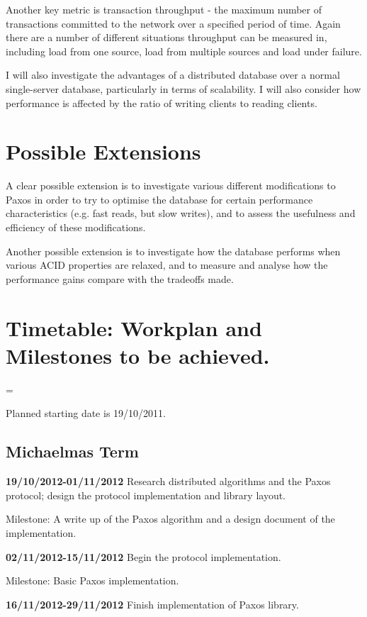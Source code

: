 Another key metric is transaction throughput - the maximum number of transactions committed to the
network over a specified period of time. Again there are a number of different situations
throughput can be measured in, including load from one source, load from multiple sources and
load under failure.

I will also investigate the advantages of a distributed database over a normal single-server
database, particularly in terms of scalability. I will also consider how performance is affected
by the ratio of writing clients to reading clients.

\section*{Possible Extensions}

A clear possible extension is to investigate various different modifications to Paxos in order
to try to optimise the database for certain performance characteristics
(e.g. fast reads, but slow writes),
and to assess the usefulness and efficiency of these modifications.

Another possible extension is to investigate how the database performs when various ACID
properties are relaxed, and to measure and analyse how the performance gains compare with the
tradeoffs made.


\section*{Timetable: Workplan and Milestones to be achieved.}

\setlength\parindent{0pt}
\parskip = \baselineskip

Planned starting date is 19/10/2011.

\subsection*{Michaelmas Term}

{\bf 19/10/2012-01/11/2012} Research distributed algorithms and the Paxos protocol; design the
protocol implementation and library layout.

Milestone: A write up of the Paxos algorithm and a design document of the implementation.

{\bf 02/11/2012-15/11/2012} Begin the protocol implementation.

Milestone: Basic Paxos implementation.

{\bf 16/11/2012-29/11/2012} Finish implementation of Paxos library.

